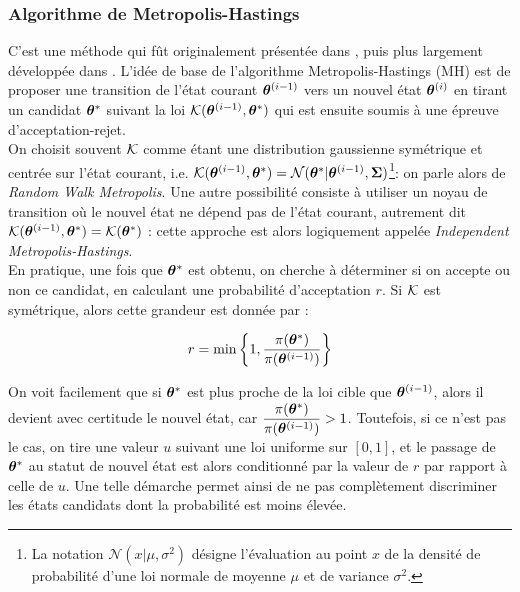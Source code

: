 \subsubsection{Algorithme de Metropolis-Hastings}

C'est une méthode qui fût originalement présentée dans \cite{Metropolis1953}, puis plus largement développée dans \cite{Hastings1970}. L'idée de base de l'algorithme Metropolis-Hastings (MH) est de proposer une transition de l'état courant ${{\bm{\theta}}^{(i-1)}}$ vers un nouvel état ${\bm{\theta}}^{(i)}$ en tirant un candidat ${{\bm{\theta}}^*}$ suivant la loi ${\mathcal{K}}({{\bm{\theta}}^{(i-1)}}, {{\bm{\theta}}^*})$ qui est ensuite soumis à une épreuve d'acceptation-rejet. \\

On choisit souvent ${\mathcal{K}}$ comme étant une distribution gaussienne symétrique et centrée sur l'état courant, i.e. ${\mathcal{K}}({{\bm{\theta}}^{(i-1)}}, {{\bm{\theta}}^*}) = \mathcal{N}({{\bm{\theta}}^*} | {{\bm{\theta}}^{(i-1)}}, {\bm{\Sigma}})$\footnote{La notation $\mathcal{N}(x|\mu,\sigma^2)$ désigne l'évaluation au point $x$ de la densité de probabilité d'une loi normale de moyenne $\mu$ et de variance $\sigma^2$.}: on parle alors de \textit{Random Walk Metropolis}. Une autre possibilité consiste à utiliser un noyau de transition où le nouvel état ne dépend pas de l'état courant, autrement dit ${\mathcal{K}}({{\bm{\theta}}^{(i-1)}}, {{\bm{\theta}}^*}) = {\mathcal{K}}({{\bm{\theta}}^*})$ : cette approche est alors logiquement appelée \textit{Independent Metropolis-Hastings}. \\

En pratique, une fois que ${{\bm{\theta}}^*}$ est obtenu, on cherche à déterminer si on accepte ou non ce candidat, en calculant une probabilité d'acceptation $r$. Si ${\mathcal{K}}$ est symétrique, alors cette grandeur est donnée par : 

\begin{equation}
	r = \min\left\{1,\dfrac{\pi({{\bm{\theta}}^*})}{\pi({{\bm{\theta}}^{(i-1)}})}\right\}
	\label{eq_acceptation_metropolis}
\end{equation}

On voit facilement que si ${{\bm{\theta}}^*}$ est plus proche de la loi cible que ${{\bm{\theta}}^{(i-1)}}$, alors il devient avec certitude le nouvel état, car $\dfrac{\pi({{\bm{\theta}}^*})}{\pi({{\bm{\theta}}^{(i-1)}})} > 1$. Toutefois, si ce n'est pas le cas, on tire une valeur $u$ suivant une loi uniforme sur $[0,1]$, et le passage de ${{\bm{\theta}}^*}$ au statut de nouvel état est alors conditionné par la valeur de $r$ par rapport à celle de $u$. Une telle démarche permet ainsi de ne pas complètement discriminer les états candidats dont la probabilité est moins élevée. \\

